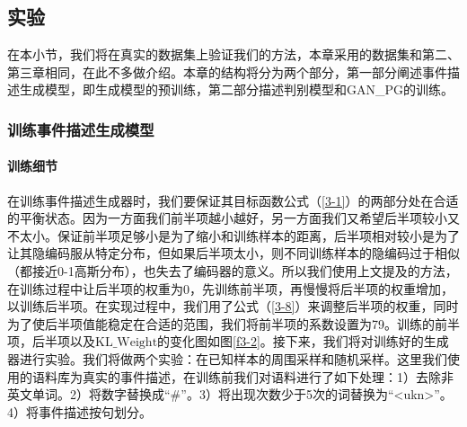 \subsection{实验}
在本小节，我们将在真实的数据集上验证我们的方法，本章采用的数据集和第二、第三章相同，在此不多做介绍。本章的结构将分为两个部分，第一部分阐述事件描述生成模型，即生成模型的预训练，第二部分描述判别模型和GAN\_PG的训练。
\subsubsection{训练事件描述生成模型}\label{train_generator}
\paragraph{训练细节}
在训练事件描述生成器时，我们要保证其目标函数公式（\ref{3-1}）的两部分处在合适的平衡状态。因为一方面我们前半项越小越好，另一方面我们又希望后半项较小又不太小。保证前半项足够小是为了缩小和训练样本的距离，后半项相对较小是为了让其隐编码服从特定分布，但如果后半项太小，则不同训练样本的隐编码过于相似（都接近0-1高斯分布），也失去了编码器的意义。所以我们使用上文提及的方法，在训练过程中让后半项的权重为0，先训练前半项，再慢慢将后半项的权重增加，以训练后半项。在实现过程中，我们用了公式（\ref{3-8}）来调整后半项的权重，同时为了使后半项值能稳定在合适的范围，我们将前半项的系数设置为79。训练的前半项，后半项以及$\mathrm{KL\_Weight}$的变化图如图\ref{f3-2}。接下来，我们将对训练好的生成器进行实验。我们将做两个实验：在已知样本的周围采样和随机采样。这里我们使用的语料库为真实的事件描述，在训练前我们对语料进行了如下处理：1）去除非英文单词。2）将数字替换成“\#”。3）将出现次数少于5次的词替换为“<ukn>”。4）将事件描述按句划分。

